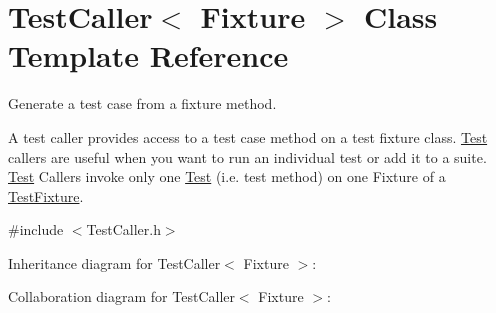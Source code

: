 \hypertarget{class_test_caller}{\section{Test\+Caller$<$ Fixture $>$ Class Template Reference}
\label{class_test_caller}
}


Generate a test case from a fixture method.

A test caller provides access to a test case method on a test fixture class. \hyperlink{class_test}{Test} callers are useful when you want to run an individual test or add it to a suite. \hyperlink{class_test}{Test} Callers invoke only one \hyperlink{class_test}{Test} (i.\+e. test method) on one Fixture of a \hyperlink{class_test_fixture}{Test\+Fixture}.  




{\ttfamily \#include $<$Test\+Caller.\+h$>$}



Inheritance diagram for Test\+Caller$<$ Fixture $>$\+:


Collaboration diagram for Test\+Caller$<$ Fixture $>$\+:
